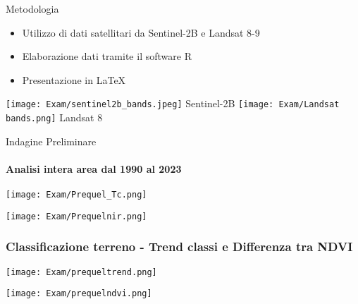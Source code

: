\documentclass{beamer}  %
\begin{document}
\begin{frame}{Metodologia}
    \begin{itemize}
        \item Utilizzo di dati satellitari da Sentinel-2B e Landsat 8-9 
        \item Elaborazione dati tramite il software R
        \item Presentazione in \LaTeX
    \end{itemize}
    \vspace{0.5cm}
    \centering %
    \texttt{[image: Exam/sentinel2b\_bands.jpeg]}
    {\tiny Sentinel-2B} %
    \vspace{0.2cm} %
    \texttt{[image: Exam/Landsat bands.png]}
    {\tiny Landsat 8} %
\end{frame}

\begin{frame}[fragile]{Indagine Preliminare}
 \framesubtitle{Analisi intera area dal 1990 al 2023}
 \begin{center} 
            \texttt{[image: Exam/Prequel\_Tc.png]}
       \end{center}
            \vspace{0.1cm}
             \begin{center} 
                \texttt{[image: Exam/Prequelnir.png]}
\end{center}
     \end{frame}
 
\begin{frame}[fragile]
    \frametitle{\scriptsize Classificazione terreno - Trend classi e Differenza tra NDVI}
 \begin{center} 
            \texttt{[image: Exam/prequeltrend.png]}
            \end{center}
             \begin{center} 

             \vspace{0.5cm}
                \texttt{[image: Exam/prequelndvi.png]}
\end{center}
     \end{frame}
\end{document}
